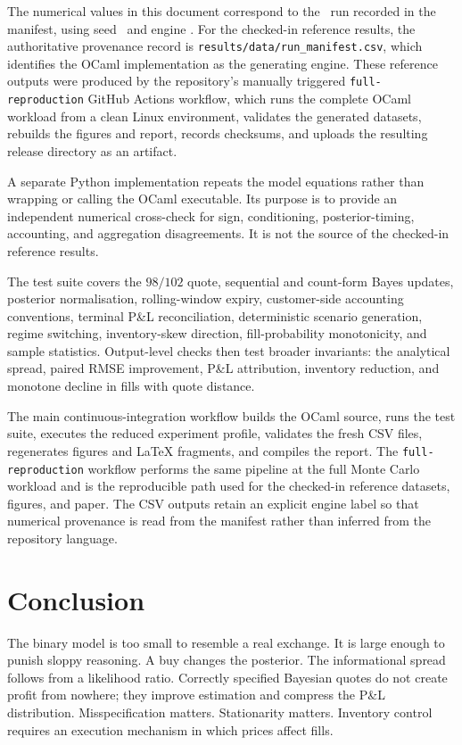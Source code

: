\documentclass[11pt]{article}
\begin{document}
The numerical values in this document correspond to the \ResultsProfile\ run recorded in the manifest, using seed \ResultsSeed\ and engine \texttt{\ResultsEngine}. For the checked-in reference results, the authoritative provenance record is \texttt{results/data/run\_manifest.csv}, which identifies the OCaml implementation as the generating engine. These reference outputs were produced by the repository's manually triggered \texttt{full-reproduction} GitHub Actions workflow, which runs the complete OCaml workload from a clean Linux environment, validates the generated datasets, rebuilds the figures and report, records checksums, and uploads the resulting release directory as an artifact.

A separate Python implementation repeats the model equations rather than wrapping or calling the OCaml executable. Its purpose is to provide an independent numerical cross-check for sign, conditioning, posterior-timing, accounting, and aggregation disagreements. It is not the source of the checked-in reference results.

The test suite covers the $98/102$ quote, sequential and count-form Bayes updates, posterior normalisation, rolling-window expiry, customer-side accounting conventions, terminal P\&L reconciliation, deterministic scenario generation, regime switching, inventory-skew direction, fill-probability monotonicity, and sample statistics. Output-level checks then test broader invariants: the analytical spread, paired RMSE improvement, P\&L attribution, inventory reduction, and monotone decline in fills with quote distance.

The main continuous-integration workflow builds the OCaml source, runs the test suite, executes the reduced experiment profile, validates the fresh CSV files, regenerates figures and LaTeX fragments, and compiles the report. The \texttt{full-reproduction} workflow performs the same pipeline at the full Monte Carlo workload and is the reproducible path used for the checked-in reference datasets, figures, and paper. The CSV outputs retain an explicit engine label so that numerical provenance is read from the manifest rather than inferred from the repository language.

\section{Conclusion}

The binary model is too small to resemble a real exchange. It is large enough to punish sloppy reasoning. A buy changes the posterior. The informational spread follows from a likelihood ratio. Correctly specified Bayesian quotes do not create profit from nowhere; they improve estimation and compress the P\&L distribution. Misspecification matters. Stationarity matters. Inventory control requires an execution mechanism in which prices affect fills.
\end{document}
